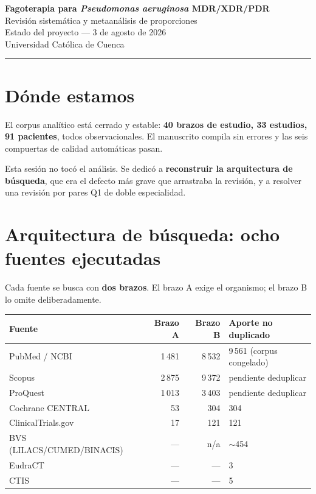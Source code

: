 \documentclass[11pt,a4paper]{article}
\begin{document}
\begin{center}
{\Large\bfseries Fagoterapia para \textit{Pseudomonas aeruginosa} MDR/XDR/PDR}\\[2pt]
{\large Revisión sistemática y metaanálisis de proporciones}\\[6pt]
{\normalsize Estado del proyecto --- 3 de agosto de 2026}\\[2pt]
{\footnotesize Universidad Católica de Cuenca}
\end{center}

\vspace{4pt}
\hrule
\vspace{10pt}

\section{Dónde estamos}

El corpus analítico está cerrado y estable: \textbf{40 brazos de estudio, 33
estudios, 91 pacientes}, todos observacionales. El manuscrito compila sin errores
y las seis compuertas de calidad automáticas pasan.

Esta sesión no tocó el análisis. Se dedicó a \textbf{reconstruir la arquitectura
de búsqueda}, que era el defecto más grave que arrastraba la revisión, y a
resolver una revisión por pares Q1 de doble especialidad.

\section{Arquitectura de búsqueda: ocho fuentes ejecutadas}

Cada fuente se busca con \textbf{dos brazos}. El brazo A exige el organismo; el
brazo B lo omite deliberadamente.

\begin{center}
\begin{tabular}{@{}lrrl@{}}
\toprule
\textbf{Fuente} & \textbf{Brazo A} & \textbf{Brazo B} & \textbf{Aporte no duplicado} \\
\midrule
PubMed / NCBI            & 1\,481 & 8\,532 & 9\,561 (corpus congelado) \\
Scopus                   & 2\,875 & 9\,372 & pendiente deduplicar \\
ProQuest                 & 1\,013 & 3\,403 & pendiente deduplicar \\
Cochrane CENTRAL         &     53 &    304 & 304 \\
ClinicalTrials.gov       &     17 &    121 & 121 \\
BVS (LILACS/CUMED/BINACIS) & --- & n/a & $\sim$454 \\
EudraCT                  & --- & --- & 3 \\
CTIS                     & --- & --- & 5 \\
\bottomrule
\end{tabular}
\end{center}
\end{document}
